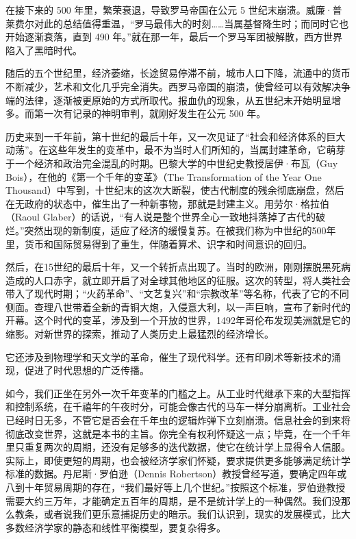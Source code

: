 在接下来的 500 年里，繁荣衰退，导致罗马帝国在公元 5 世纪末崩溃。威廉·普莱费尔对此的总结值得重温，“罗马最伟大的时刻……当属基督降生时；而同时它也开始逐渐衰落，直到 490 年。”就在那一年，最后一个罗马军团被解散，西方世界陷入了黑暗时代。


随后的五个世纪里，经济萎缩，长途贸易停滞不前，城市人口下降，流通中的货币不断减少，艺术和文化几乎完全消失。西罗马帝国的崩溃，使曾经可以有效解决争端的法律，逐渐被更原始的方式所取代。报血仇的现象，从五世纪末开始明显增多。而第一次有记录的神明审判，就刚好发生在公元 500 年。


历史来到一千年前，第十世纪的最后十年，又一次见证了“社会和经济体系的巨大动荡”。在这些年发生的变革中，最不为当时人们所知的，当属封建革命，它萌芽于一个经济和政治完全混乱的时期。巴黎大学的中世纪史教授居伊·布瓦（Guy Bois），在他的《第一个千年的变革》（The Transformation of the Year One Thousand）中写到，十世纪末的这次大断裂，使古代制度的残余彻底崩盘，然后在无政府的状态中，催生出了一种新事物，那就是封建主义。用劳尔·格拉伯（Raoul Glaber）的话说，“有人说是整个世界全心一致地抖落掉了古代的破烂。”突然出现的新制度，适应了经济的缓慢复苏。在被我们称为中世纪的500年里，货币和国际贸易得到了重生，伴随着算术、识字和时间意识的回归。


然后，在15世纪的最后十年，又一个转折点出现了。当时的欧洲，刚刚摆脱黑死病造成的人口赤字，就立即开启了对全球其他地区的征服。这次的转型，将人类社会带入了现代时期；“火药革命”、“文艺复兴”和“宗教改革”等名称，代表了它的不同侧面。查理八世带着全新的青铜大炮，入侵意大利，以一声巨响，宣布了新时代的开幕。这个时代的变革，涉及到一个开放的世界，1492年哥伦布发现美洲就是它的缩影。对新世界的探索，推动了人类历史上最猛烈的经济增长。


它还涉及到物理学和天文学的革命，催生了现代科学。还有印刷术等新技术的涌现，促进了时代思想的广泛传播。


如今，我们正坐在另外一次千年变革的门槛之上。从工业时代继承下来的大型指挥和控制系统，在千禧年的午夜时分，可能会像古代的马车一样分崩离析。工业社会已经时日无多，不管它是否会在千年虫的逻辑炸弹下立刻崩溃。信息社会的到来将彻底改变世界，这就是本书的主旨。你完全有权利怀疑这一点；毕竟，在一个千年里只重复两次的周期，还没有足够多的迭代数据，使它在统计学上显得令人信服。实际上，即使更短的周期，也会被经济学家们怀疑，要求提供更多能够满足统计学标准的数据。丹尼斯·罗伯逊（Dennis Robertson）教授曾经写道，要确定四年或八到十年贸易周期的存在，“我们最好等上几个世纪。”按照这个标准，罗伯逊教授需要大约三万年，才能确定五百年的周期，是不是统计学上的一种偶然。我们没那么教条，或者说我们更乐意捕捉历史的暗示。我们认识到，现实的发展模式，比大多数经济学家的静态和线性平衡模型，要复杂得多。


